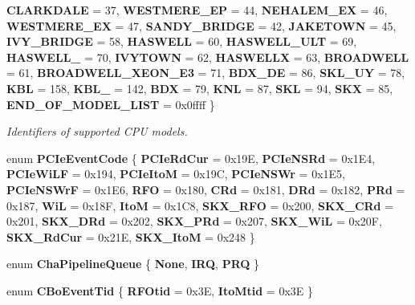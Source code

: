 \begin{DoxyCompactItemize}
{\bfseries C\+L\+A\+R\+K\+D\+A\+LE} = 37, 
{\bfseries W\+E\+S\+T\+M\+E\+R\+E\+\_\+\+EP} = 44, 
\newline
{\bfseries N\+E\+H\+A\+L\+E\+M\+\_\+\+EX} = 46, 
{\bfseries W\+E\+S\+T\+M\+E\+R\+E\+\_\+\+EX} = 47, 
{\bfseries S\+A\+N\+D\+Y\+\_\+\+B\+R\+I\+D\+GE} = 42, 
{\bfseries J\+A\+K\+E\+T\+O\+WN} = 45, 
\newline
{\bfseries I\+V\+Y\+\_\+\+B\+R\+I\+D\+GE} = 58, 
{\bfseries H\+A\+S\+W\+E\+LL} = 60, 
{\bfseries H\+A\+S\+W\+E\+L\+L\+\_\+\+U\+LT} = 69, 
{\bfseries H\+A\+S\+W\+E\+L\+L\+\_} = 70, 
\newline
{\bfseries I\+V\+Y\+T\+O\+WN} = 62, 
{\bfseries H\+A\+S\+W\+E\+L\+LX} = 63, 
{\bfseries B\+R\+O\+A\+D\+W\+E\+LL} = 61, 
{\bfseries B\+R\+O\+A\+D\+W\+E\+L\+L\+\_\+\+X\+E\+O\+N\+\_\+\+E3} = 71, 
\newline
{\bfseries B\+D\+X\+\_\+\+DE} = 86, 
{\bfseries S\+K\+L\+\_\+\+UY} = 78, 
{\bfseries K\+BL} = 158, 
{\bfseries K\+B\+L\+\_} = 142, 
\newline
{\bfseries B\+DX} = 79, 
{\bfseries K\+NL} = 87, 
{\bfseries S\+KL} = 94, 
{\bfseries S\+KX} = 85, 
\newline
{\bfseries E\+N\+D\+\_\+\+O\+F\+\_\+\+M\+O\+D\+E\+L\+\_\+\+L\+I\+ST} = 0x0ffff
 \}
\begin{DoxyCompactList}\small\item\em Identifiers of supported C\+PU models. \end{DoxyCompactList}\item 
\mbox{\label{class_p_c_m_a77b8031a61ae839bdd021ee7b56aa585}} 
enum {\bfseries P\+C\+Ie\+Event\+Code} \{ \newline
{\bfseries P\+C\+Ie\+Rd\+Cur} = 0x19E, 
{\bfseries P\+C\+Ie\+N\+S\+Rd} = 0x1\+E4, 
{\bfseries P\+C\+Ie\+Wi\+LF} = 0x194, 
{\bfseries P\+C\+Ie\+ItoM} = 0x19C, 
\newline
{\bfseries P\+C\+Ie\+N\+S\+Wr} = 0x1\+E5, 
{\bfseries P\+C\+Ie\+N\+S\+WrF} = 0x1\+E6, 
{\bfseries R\+FO} = 0x180, 
{\bfseries C\+Rd} = 0x181, 
\newline
{\bfseries D\+Rd} = 0x182, 
{\bfseries P\+Rd} = 0x187, 
{\bfseries WiL} = 0x18F, 
{\bfseries ItoM} = 0x1\+C8, 
\newline
{\bfseries S\+K\+X\+\_\+\+R\+FO} = 0x200, 
{\bfseries S\+K\+X\+\_\+\+C\+Rd} = 0x201, 
{\bfseries S\+K\+X\+\_\+\+D\+Rd} = 0x202, 
{\bfseries S\+K\+X\+\_\+\+P\+Rd} = 0x207, 
\newline
{\bfseries S\+K\+X\+\_\+\+WiL} = 0x20F, 
{\bfseries S\+K\+X\+\_\+\+Rd\+Cur} = 0x21E, 
{\bfseries S\+K\+X\+\_\+\+ItoM} = 0x248
 \}
\item 
\mbox{\label{class_p_c_m_afd71939913b70911ed3d076b07e18308}} 
enum {\bfseries Cha\+Pipeline\+Queue} \{ {\bfseries None}, 
{\bfseries I\+RQ}, 
{\bfseries P\+RQ}
 \}
\item 
\mbox{\label{class_p_c_m_a6c72526891bf528aaf85b18103c7b07b}} 
enum {\bfseries C\+Bo\+Event\+Tid} \{ {\bfseries R\+F\+Otid} = 0x3E, 
{\bfseries Ito\+Mtid} = 0x3E
 \}
\end{DoxyCompactItemize}
